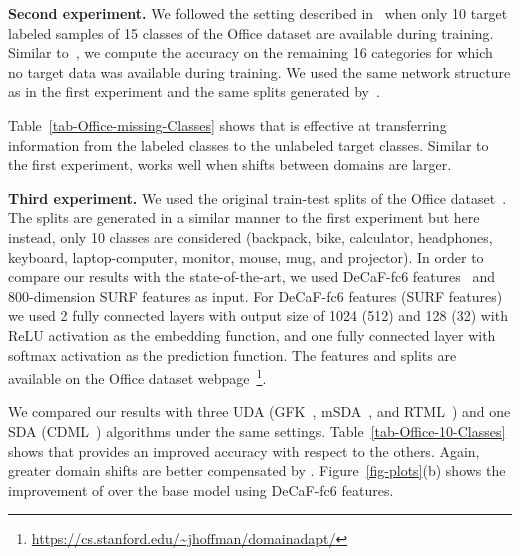 \noindent \textbf{Second experiment.}  We followed the setting described in~\cite{tzengHDS15iccv} when only 10 target labeled samples of 15 classes of the Office dataset are available during training. Similar to~\cite{tzengHDS15iccv}, we compute the accuracy on the remaining 16 categories for which no target data was available during training. We used the same network structure as in the first experiment and the same splits generated by~\cite{tzengHDS15iccv}.

Table~\ref{tab-Office-missing-Classes} shows that \modelDA is effective at transferring information from the labeled classes to the unlabeled target classes. Similar to the first experiment, \modelDA works well when shifts between domains are larger.

\noindent \textbf{Third experiment.} We used the original train-test splits of the Office dataset~\cite{saenkoKFD2010eccv}. The splits are generated in a similar manner to the first experiment but here instead, only 10 classes are considered (backpack, bike, calculator, headphones, keyboard, laptop-computer, monitor, mouse, mug, and projector). In order to compare our results with the state-of-the-art, we used DeCaF-fc6 features~\cite{Donahue13decaf} and 800-dimension SURF features as input.  For DeCaF-fc6 features (SURF features) we used 2 fully connected layers with output size of 1024 (512) and 128 (32) with ReLU activation as the embedding function, and one fully connected layer with softmax activation as the prediction function.
The features and splits are available on the Office dataset webpage~\footnote{\url{https://cs.stanford.edu/~jhoffman/domainadapt/}}.

We compared our results with three UDA (GFK~\cite{gong2012geodesic}, mSDA~\cite{chen2012marginalized}, and RTML~\cite{ding2017robust}) and one SDA (CDML~\cite{wang2014cross}) algorithms under the same settings. Table~\ref{tab-Office-10-Classes} shows that \modelDA provides an improved accuracy with respect to the others. Again, greater domain shifts are better compensated by \modelDA. Figure~\ref{fig-plots}(b) shows the improvement of \modelDA over the base model using DeCaF-fc6 features.

\begin{comment}
\modelDA did not win 3 out of 6 cases. That is most likely attributed to the fact that the network used here is more suitable for sparse features like DeCaF-fc6 than non-sparse features like SURF. Indeed, \modelDA is more suitable for CNN networks followed by fully connected layers.
\end{comment}


